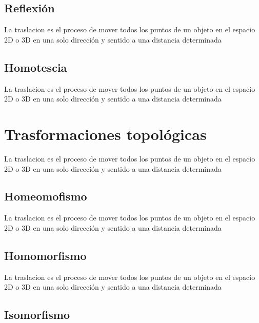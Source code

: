 \documentclass[16pt,]{krantz}
\theoremstyle{definition}
\theoremstyle{definition}
\theoremstyle{definition}
\theoremstyle{definition}
\theoremstyle{remark}
\begin{document}
\hypertarget{reflexiuxf3n}{%
\subsection{Reflexión}\label{reflexiuxf3n}}

La traslacion es el proceso de mover todos los puntos de un objeto en el espacio 2D o 3D en una solo dirección y sentido a una distancia determinada

\hypertarget{homotescia}{%
\subsection{Homotescia}\label{homotescia}}

La traslacion es el proceso de mover todos los puntos de un objeto en el espacio 2D o 3D en una solo dirección y sentido a una distancia determinada

\hypertarget{trasformaciones-topoluxf3gicas}{%
\section{Trasformaciones topológicas}\label{trasformaciones-topoluxf3gicas}}

La traslacion es el proceso de mover todos los puntos de un objeto en el espacio 2D o 3D en una solo dirección y sentido a una distancia determinada

\hypertarget{homeomofismo}{%
\subsection{Homeomofismo}\label{homeomofismo}}

La traslacion es el proceso de mover todos los puntos de un objeto en el espacio 2D o 3D en una solo dirección y sentido a una distancia determinada

\hypertarget{homomorfismo}{%
\subsection{Homomorfismo}\label{homomorfismo}}

La traslacion es el proceso de mover todos los puntos de un objeto en el espacio 2D o 3D en una solo dirección y sentido a una distancia determinada \citep{xie2015}

\hypertarget{isomorfismo}{%
\subsection{Isomorfismo}\label{isomorfismo}}
\end{document}
